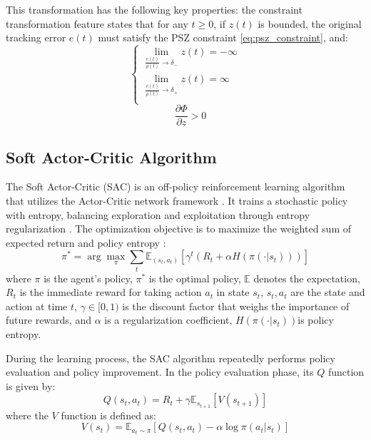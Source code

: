 \documentclass[preprint,12pt]{elsarticle}
\begin{document}
\begin{rmk}
This transformation has the following key properties: the constraint transformation feature states that for any $t \geq 0$, if $z(t)$ is bounded, the original tracking error $e(t)$ must satisfy the PSZ constraint \eqref{eq:psz_constraint}, and:
\begin{equation}
    \begin{cases} 
        \lim_{\frac{e(t)}{\rho(t)}\to\delta_{-}}z(t)=-\infty\\
        \lim_{\frac{e(t)}{\rho(t)}\to\delta_{+}}z(t)=\infty\\
    \end{cases}
\end{equation}
\begin{equation}
    \quad \frac{\partial \Phi}{\partial z} > 0
    \label{eq:phi_property}
\end{equation}
\end{rmk}

\subsection{Soft Actor-Critic Algorithm}

The Soft Actor-Critic (SAC) is an off-policy reinforcement learning algorithm that utilizes the Actor-Critic network framework \cite{haarnoja2018softactorcriticoffpolicymaximum,6492103}. It trains a stochastic policy with entropy, balancing exploration and exploitation through entropy regularization \cite{pmlr-v32-silver14}. The optimization objective is to maximize the weighted sum of expected return and policy entropy \cite{10502346}:
\begin{equation}
\pi^* = \arg \max_\pi \sum_{t} \mathbb{E}_{(s_t,a_t)} \left[ \gamma^t \left( R_t + \alpha H(\pi(\cdot | s_t)) \right) \right]
\end{equation}
where $\pi$ is the agent's policy, $\pi^*$ is the optimal policy, $\mathbb{E}$ denotes the expectation, $R_t$ is the immediate reward for taking action $a_t$ in state $s_t$, $s_t,a_t$ are the state and action at time $t$, $\gamma \in [0,1)$ is the discount factor that weighs the importance of future rewards, and $\alpha$ is a regularization coefficient, $H(\pi(\cdot | s_t))$is policy entropy.

During the learning process, the SAC algorithm repeatedly performs policy evaluation and policy improvement. In the policy evaluation phase, its $Q$ function is given by:
\begin{equation}
    Q(s_t, a_t) = R_t  + \gamma \mathbb{E}_{s_{t+1}} \left[ V(s_{t+1}) \right]
\end{equation}
where the $V$ function is defined as:
\begin{equation}
V(s_t) = \mathbb{E}_{ a_t \sim \pi} \left[  Q(s_t, a_t) - \alpha \log \pi(a_t | s_t) \right]
\end{equation}
\end{document}
